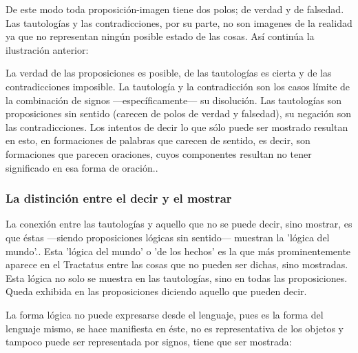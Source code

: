     De este modo toda proposición-imagen tiene dos polos; de verdad y de falsedad.
    Las tautologías y las contradicciones, por su parte, no son imagenes de la
    realidad ya que no representan ningún posible estado de las cosas. Así continúa
    la ilustración anterior:


    La verdad de las proposiciones es posible, de las tautologías es cierta y de las
    contradicciones imposible. La tautología y la contradicción son los casos límite
    de la combinación de signos ---específicamente--- su
    disolución.\autocite[cf.~][4.464 y 4.466]{wittgenstein1922tractatus} Las tautologías son
    proposiciones sin sentido (carecen de polos de verdad y falsedad), su negación son
    las contradicciones. Los intentos de decir lo que sólo puede ser mostrado
    resultan en esto, en formaciones de palabras que carecen de sentido, es decir,
    son formaciones que parecen oraciones, cuyos componentes resultan no tener
    significado en esa forma de oración.\autocite[cf.~][p.~163~\S2]{anscombe1959iwt}.

\subsubsection{La distinción entre el decir y el mostrar}
      La conexión entre las tautologías y aquello que no se puede decir, sino
      mostrar, es que éstas ---siendo proposiciones lógicas sin sentido--- muestran
      la 'lógica del mundo'.\autocite[cf.~][p.~163~\S3]{anscombe1959iwt}. Esta 'lógica del
      mundo' o 'de los hechos' es la que más prominentemente aparece en el Tractatus
      entre las cosas que no pueden ser dichas, sino mostradas. Esta lógica no solo
      se muestra en las tautologías, sino en todas las proposiciones. Queda exhibida
      en las proposiciones diciendo aquello que pueden decir.

      La forma lógica no puede expresarse desde el lenguaje, pues es la forma del
      lenguaje mismo, se hace manifiesta en éste, no es representativa de los objetos
      y tampoco puede ser representada por signos, tiene que ser mostrada:

